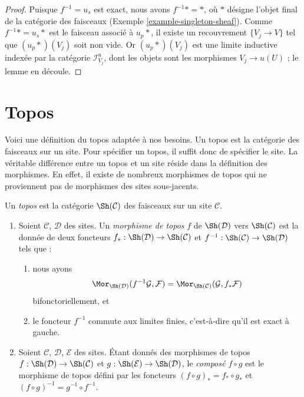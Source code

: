 \begin{proof}
Puisque $f^{-1} = u_s$ est exact, nous avons $f^{-1}* = *$, où $*$ désigne
l’objet final de la catégorie des faisceaux
(Exemple \ref{example-singleton-sheaf}).
Comme $f^{-1}* = u_s*$ est le faisceau associé à $u_p*$, il existe
un recouvrement $\{V_j \to V\}$ tel que $(u_p*)(V_j)$ soit non vide.
Or $(u_p*)(V_j)$ est une limite inductive indexée par la catégorie
$\mathcal{I}^u_{V_j}$, dont les objets sont les morphismes $V_j \to u(U)$ ;
le lemme en découle.
\end{proof}

























\section{Topos}
\label{section-topoi}

\noindent
Voici une définition du topos adaptée à nos besoins.
Un topos est la catégorie des faisceaux sur un site. Pour spécifier
un topos, il suffit donc de spécifier le site. La véritable différence entre un topos
et un site réside dans la définition des morphismes. En effet, il existe
de nombreux morphismes de topos qui ne proviennent pas de morphismes
des sites sous-jacents.

\begin{definition}[Topos]
\label{definition-topos}
Un {\it topos} est la catégorie $\Sh(\mathcal{C})$ des faisceaux
sur un site $\mathcal{C}$.
\begin{enumerate}
\item Soient $\mathcal{C}$, $\mathcal{D}$ des sites.
Un {\it morphisme de topos} $f$ de $\Sh(\mathcal{D})$
vers $\Sh(\mathcal{C})$ est la donnée de deux foncteurs
$f_* : \Sh(\mathcal{D}) \to \Sh(\mathcal{C})$
et
$f^{-1} : \Sh(\mathcal{C}) \to \Sh(\mathcal{D})$
tels que :
\begin{enumerate}
\item nous ayons
$$
\Mor_{\Sh(\mathcal{D})}(f^{-1}\mathcal{G}, \mathcal{F})
=
\Mor_{\Sh(\mathcal{C})}(\mathcal{G}, f_*\mathcal{F})
$$
bifonctoriellement, et
\item le foncteur $f^{-1}$ commute aux limites finies, c’est-à-dire
qu’il est exact à gauche.
\end{enumerate}
\item Soient $\mathcal{C}$, $\mathcal{D}$, $\mathcal{E}$ des sites.
Étant donnés des morphismes de topos
$f :\Sh(\mathcal{D}) \to \Sh(\mathcal{C})$ et
$g :\Sh(\mathcal{E}) \to \Sh(\mathcal{D})$, le
{\it composé $f\circ g$} est le morphisme de topos défini
par les foncteurs
$(f \circ g)_* = f_* \circ g_*$ et
$(f \circ g)^{-1} = g^{-1} \circ f^{-1}$.
\end{enumerate}
\end{definition}


